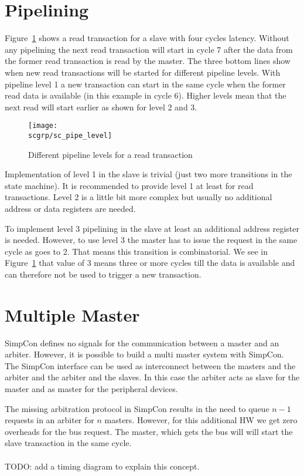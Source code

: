 \section{Pipelining}

Figure~\ref{fig:sc:pipe:level} shows a read transaction for a slave
with four cycles latency. Without any pipelining the next read
transaction will start in cycle 7 after the data from the former
read transaction is read by the master. The three bottom lines show
when new read transactions will be started for different pipeline
levels. With pipeline level 1 a new transaction can start in the
same cycle when the former read data is available (in this example
in cycle 6). Higher levels mean that the next read will start
earlier as shown for level 2 and 3.

\begin{figure}
    \centering
    \texttt{[image: \\scgrp/sc\_pipe\_level]}
    \caption{Different pipeline levels for a read transaction}
    \label{fig:sc:pipe:level}
\end{figure}

Implementation of level 1 in the slave is trivial (just two more
transitions in the state machine). It is recommended to provide
level 1 at least for read transactions. Level 2 is a little bit more
complex but usually no additional address or data registers are
needed.

To implement level 3 pipelining in the slave at least an additional
address register is needed. However, to use level 3 the master has
to issue the request in the same cycle as  goes to 2.
That means this transition is combinatorial. We see in
Figure~\ref{fig:sc:pipe:level} that  value of 3 means
three or more cycles till the data is available and can therefore
not be used to trigger a new transaction.

\section{Multiple Master}

SimpCon defines no signals for the communication between a master
and an arbiter. However, it is possible to build a multi master
system with SimpCon. The SimpCon interface can be used as
interconnect between the masters and the arbiter and the arbiter and
the slaves. In this case the arbiter acts as slave for the master
and as master for the peripheral devices.

The missing arbitration protocol in SimpCon results in the need to
queue $n-1$ requests in an arbiter for $n$ masters. However, for
this additional HW we get zero overheads for the bus request. The
master, which gets the bus will will start the slave transaction in
the same cycle.
\\
\\
TODO: add a timing diagram to explain this concept.


